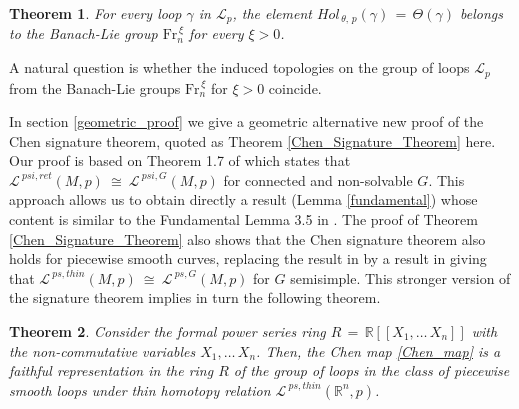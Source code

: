 \documentclass{amsart}
\newcommand{\R}{{\mathbb R}}
\newtheorem{theorem}{Theorem}[section]
\newtheorem{corollary}[theorem]{Corollary}
\begin{document}
\begin{theorem}\label{main2}
For every loop $\gamma$ in $\mathcal{L}_p$, the element $Hol_{\,\theta,\,p}(\gamma)\,=\,\Theta(\gamma)$ belongs to the Banach-Lie group $\mbox{Fr}_n^{\,\xi}$ for every $\xi>0$.
\end{theorem}








A natural question is whether the induced topologies on the group of loops $\mathcal{L}_p$ from the Banach-Lie groups $\mbox{Fr}_n^{\,\xi}$ for $\xi>0$ coincide.

In section \ref{geometric_proof} we give a geometric alternative new proof of the Chen signature theorem, quoted as Theorem \ref{Chen_Signature_Theorem} here.  
Our proof is based on Theorem 1.7 of 
\cite{Holonomy} which states that  $\mathcal{L}^{\ psi,ret}(M,p)\ \cong\ \mathcal{L}^{\ psi,G}(M,p)$ for  connected and non-solvable $G$.  This approach allows us to obtain directly a result (Lemma \ref{fundamental}) whose content is  similar to the Fundamental Lemma 3.5 in  \cite{Chen2}. 
 The proof of Theorem \ref{Chen_Signature_Theorem}  also shows that the Chen signature theorem also holds 
for piecewise smooth curves, replacing the result in  \cite{Holonomy} by a result in 
 \cite{Tlas} giving that $\mathcal{L}^{\ ps,thin}(M,p)\ \cong\ \mathcal{L}^{\ ps,G}(M,p)$ for $G$ semisimple.   This stronger version of the signature theorem implies in turn the following theorem. 




\begin{theorem}\label{generalization}
Consider the formal power series ring $R\,=\,\R[[X_1,\ldots\,X_n]]$ with the non-commutative variables $X_1,\ldots\,X_n$. Then, the Chen map \eqref{Chen_map} is a faithful representation in the ring $R$ of the group of loops in the class of piecewise smooth loops under thin homotopy relation $\mathcal{L}^{\ ps,thin}(\R^n,p)$.
\end{theorem}
\end{document}
